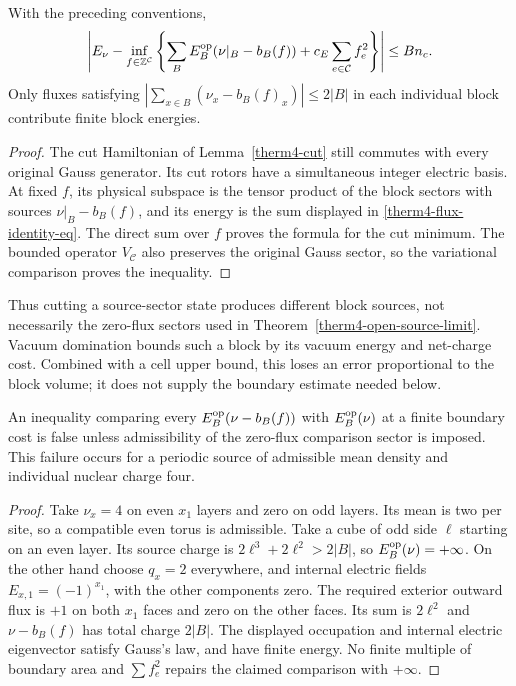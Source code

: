 \begin{proposition}
\label{therm4-flux-identity}
With the preceding conventions,
\begin{equation}
 \left|E_\nu-
 \inf_{f\in\mathbb Z^{\mathcal C}}
 \left\{\sum_B E_B^{\rm op}(\nu|_B-b_B(f))
                         +c_E\sum_{e\in\mathcal C}f_e^2\right\}
 \right|\le Bn_c.
 \label{therm4-flux-identity-eq}
\end{equation}
Only fluxes satisfying
$|\sum_{x\in B}(\nu_x-b_B(f)_x)|\le2|B|$ in each individual block contribute
finite block energies.
\end{proposition}
\begin{proof}
The cut Hamiltonian of Lemma~\ref{therm4-cut} still commutes with
every original Gauss generator.  Its cut rotors have a simultaneous
integer electric basis.  At fixed $f$, its physical subspace is the
tensor product of the block sectors with sources $\nu|_B-b_B(f)$,
and its energy is the sum displayed in \eqref{therm4-flux-identity-eq}.
The direct sum over $f$ proves the formula for the cut minimum.
The bounded operator $V_{\mathcal C}$ also preserves the original
Gauss sector, so the variational comparison proves the inequality.
\end{proof}

Thus cutting a source-sector state produces different block sources,
not necessarily the zero-flux sectors used in
Theorem~\ref{therm4-open-source-limit}.  Vacuum domination bounds such a
block by its vacuum energy and net-charge cost.  Combined with a cell
upper bound, this loses an error proportional to the block volume;
it does not supply the boundary estimate needed below.

\begin{proposition}
\label{therm4-admissibility-obstruction}
An inequality comparing every $E_B^{\rm op}(\nu-b_B(f))$ with
$E_B^{\rm op}(\nu)$ at a finite boundary cost is false unless
admissibility of the zero-flux comparison sector is imposed.
This failure occurs for a periodic source of admissible mean density
and individual nuclear charge four.
\end{proposition}
\begin{proof}
Take $\nu_x=4$ on even $x_1$ layers and zero on odd layers.
Its mean is two per site, so a compatible even torus is admissible.
Take a cube of odd side $\ell$ starting on an even layer.  Its source
charge is $2\ell^3+2\ell^2>2|B|$, so $E_B^{\rm op}(\nu)=+\infty$.
On the other hand choose $q_x=2$ everywhere, and internal electric
fields $E_{x,1}=(-1)^{x_1}$, with the other components zero.
The required exterior outward flux is $+1$ on both $x_1$ faces
and zero on the other faces.  Its sum is $2\ell^2$ and
$\nu-b_B(f)$ has total charge $2|B|$.  The displayed occupation
and internal electric eigenvector satisfy Gauss's law, and have
finite energy.  No finite multiple of boundary area and
$\sum f_e^2$ repairs the claimed comparison with $+\infty$.
\end{proof}

